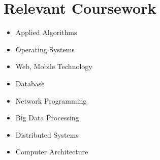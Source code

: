 \documentclass[letterpaper,11pt]{article}
\newcommand{\resumeSubHeadingListStart}{\begin{itemize}[leftmargin=0.0in, label={}]}
\newcommand{\resumeSubHeadingListEnd}{\end{itemize}}
\begin{document}
\section{Relevant Coursework}
        \begin{multicols}{4}
            \begin{itemize}[itemsep=-5pt, parsep=3pt]
                \item\small Applied Algorithms
                \item\small Operating Systems
                \item\small Web, Mobile Technology
                \item\small Database
                \item\small Network Programming
                \item\small Big Data Processing
                \item\small Distributed Systems
                \item\small Computer Architecture
            \end{itemize}
        \end{multicols}
        \vspace*{2.0\multicolsep}
\end{document}
